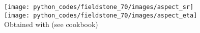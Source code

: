 \begin{center}
\texttt{[image: python\_codes/fieldstone\_70/images/aspect\_sr]}\\
\texttt{[image: python\_codes/fieldstone\_70/images/aspect\_eta]}\\
{\captionfont Obtained with \aspect (see cookbook)}
\end{center}






